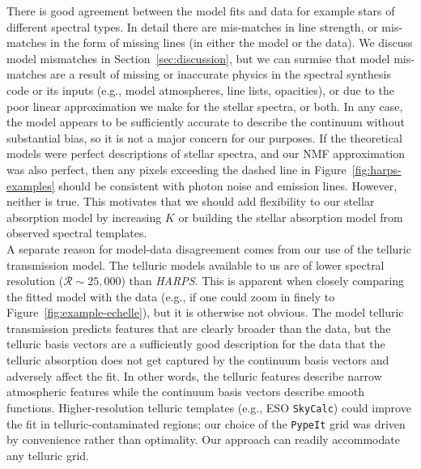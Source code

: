 \documentclass[modern,linenumbers]{aastex631}
\newcommand{\project}[1]{\textit{#1}}
\newcommand{\harps}{\project{HARPS}}
\renewcommand{\added}[1]{#1}
\begin{document}
There is good agreement between the model fits and data for example stars of different spectral types. In detail there are mis-matches in line strength, or mis-matches in the form of missing lines (in either the model or the data). We discuss model mismatches in Section~\ref{sec:discussion}, but we can surmise that model mis-matches are a result of missing or inaccurate physics in the spectral synthesis code or its inputs (e.g., model atmospheres, line lists, opacities), or due to the poor linear approximation we make for the stellar spectra, or both. In any case, the model appears to be sufficiently accurate to describe the continuum without substantial bias, so it is not a major concern for our purposes. \added{If the theoretical models were perfect descriptions of stellar spectra, and our NMF approximation was also perfect, then any pixels exceeding the dashed line in Figure~\ref{fig:harps-examples} should be consistent with photon noise and emission lines. However, neither is true. This motivates that we should add flexibility to our stellar absorption model by increasing $K$ or building the stellar absorption model from observed spectral templates.}\\

A separate reason for model-data disagreement comes from our use of the telluric transmission model. The telluric models available to us are of lower spectral resolution ($\mathcal{R} \sim 25{,}000$) than \harps. This is apparent when closely comparing the fitted model with the data (e.g., if one could zoom in finely to Figure~\ref{fig:example-echelle}), but it is otherwise not obvious. The model telluric transmission predicts features that are clearly broader than the data, but the telluric basis vectors are a sufficiently good description for the data that the telluric absorption does not get captured by the continuum basis vectors and adversely affect the fit. \added{In other words, the telluric features describe narrow atmospheric features while the continuum basis vectors describe smooth functions.} \added{Higher-resolution telluric templates (e.g., ESO \texttt{SkyCalc}) could improve the fit in telluric-contaminated regions; our choice of the \texttt{PypeIt} grid was driven by convenience rather than optimality. Our approach can readily accommodate any telluric grid.}\\
\end{document}
